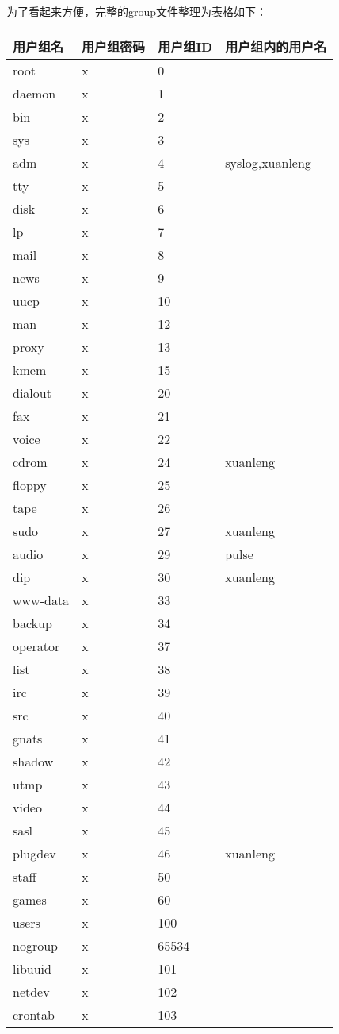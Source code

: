 \newpage
为了看起来方便，完整的group文件整理为表格如下：\\
{\tiny
\begin{center}
\begin{longtable}{|l|l|l|l|}
用户组名&用户组密码&用户组ID&用户组内的用户名\\
\hline
root&x&0&\\
daemon&x&1&\\
bin&x&2&\\
sys&x&3&\\
adm&x&4&syslog,xuanleng\\
tty&x&5&\\
disk&x&6&\\
lp&x&7&\\
mail&x&8&\\
news&x&9&\\
uucp&x&10&\\
man&x&12&\\
proxy&x&13&\\
kmem&x&15&\\
dialout&x&20&\\
fax&x&21&\\
voice&x&22&\\
cdrom&x&24&xuanleng\\
floppy&x&25&\\
tape&x&26&\\
sudo&x&27&xuanleng\\
audio&x&29&pulse\\
dip&x&30&xuanleng\\
www-data&x&33&\\
backup&x&34&\\
operator&x&37&\\
list&x&38&\\
irc&x&39&\\
src&x&40&\\
gnats&x&41&\\
shadow&x&42&\\
utmp&x&43&\\
video&x&44&\\
sasl&x&45&\\
plugdev&x&46&xuanleng\\
staff&x&50&\\
games&x&60&\\
users&x&100&\\
nogroup&x&65534&\\
libuuid&x&101&\\
netdev&x&102&\\
crontab&x&103&\\

\end{longtable}
\end{center}}
